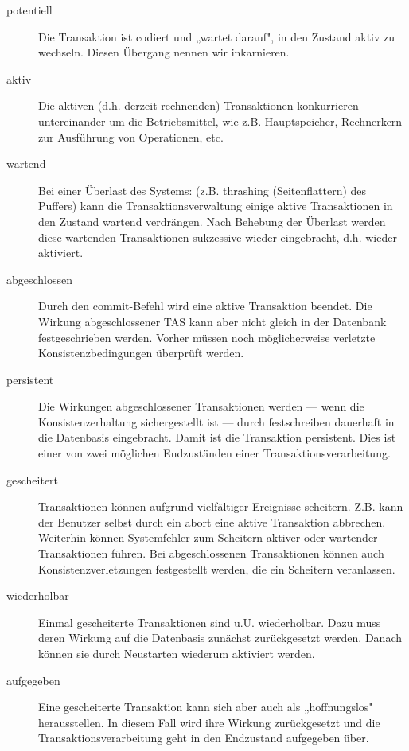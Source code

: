 \documentclass{lehramt-informatik}
\begin{document}
\begin{description}
\item[potentiell]

Die Transaktion ist codiert und „wartet darauf", in den Zustand aktiv zu
wechseln. Diesen Übergang nennen wir inkarnieren.

\item[aktiv]

Die aktiven (d.h. derzeit rechnenden) Transaktionen konkurrieren
untereinander um die Betriebsmittel, wie z.B. Hauptspeicher, Rechnerkern
zur Ausführung von Operationen, etc.

\item[wartend]

Bei einer Überlast des Systems: (z.B. thrashing (Seitenflattern) des
Puffers) kann die Transaktionsverwaltung einige aktive Transaktionen in
den Zustand wartend verdrängen. Nach Behebung der Überlast werden diese
wartenden Transaktionen sukzessive wieder eingebracht, d.h. wieder
aktiviert.

\item[abgeschlossen]

Durch den commit-Befehl wird eine aktive Transaktion beendet. Die
Wirkung abgeschlossener TAS kann aber nicht gleich in der Datenbank
festgeschrieben werden. Vorher müssen noch möglicherweise verletzte
Konsistenzbedingungen überprüft werden.

\item[persistent]

Die Wirkungen abgeschlossener Transaktionen werden — wenn die
Konsistenzerhaltung sichergestellt ist — durch festschreiben dauerhaft
in die Datenbasis eingebracht. Damit ist die Transaktion persistent.
Dies ist einer von zwei möglichen Endzuständen einer
Transaktionsverarbeitung.

\item[gescheitert]

Transaktionen können aufgrund vielfältiger Ereignisse scheitern. Z.B.
kann der Benutzer selbst durch ein abort eine aktive Transaktion
abbrechen. Weiterhin können Systemfehler zum Scheitern aktiver oder
wartender Transaktionen führen. Bei abgeschlossenen Transaktionen können
auch Konsistenzverletzungen festgestellt werden, die ein Scheitern
veranlassen.

\item[wiederholbar]

Einmal gescheiterte Transaktionen sind u.U. wiederholbar. Dazu muss
deren Wirkung auf die Datenbasis zunächst zurückgesetzt werden. Danach
können sie durch Neustarten wiederum aktiviert werden.

\item[aufgegeben]

Eine gescheiterte Transaktion kann sich aber auch als „hoffnungslos"
herausstellen. In diesem Fall wird ihre Wirkung zurückgesetzt und die
Transaktionsverarbeitung geht in den Endzustand aufgegeben über.
\end{description}
\end{document}

